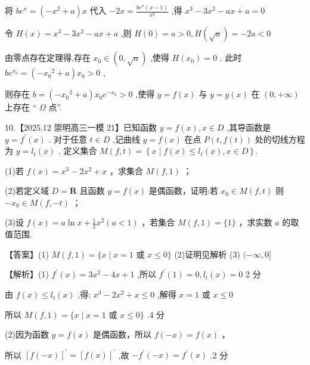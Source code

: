 \documentclass[10pt]{article}
\begin{document}
将 \(b{e}^{x} = \left( {-{x}^{2} + a}\right) x\) 代入 \(- {2x} = \frac{b{e}^{x}\left( {x - 1}\right) }{{x}^{2}}\) ,得 \({x}^{3} - 3{x}^{2} - {ax} + a = 0\)

令 \(H\left( x\right)  = {x}^{3} - 3{x}^{2} - {ax} + a\) ,则 \(H\left( 0\right)  = a > 0,H\left( \sqrt{a}\right)  =  - {2a} < 0\)

由零点存在定理得,存在 \({x}_{0} \in  \left( {0,\sqrt{a}}\right)\) ,使得 \(H\left( {x}_{0}\right)  = 0\) . 此时 \(b{e}^{{x}_{0}} = \left( {-{x}_{0}{}^{2} + a}\right) {x}_{0} > 0\) ,

则存在 \(b = \left( {-{x}_{0}{}^{2} + a}\right) {x}_{0}{e}^{-{x}_{0}} > 0\) ,使得 \(y = f\left( x\right)\) 与 \(y = g\left( x\right)\) 在 \(\left( {0, + \infty }\right)\) 上存在 “ \(\Omega\) 点”.

10.【2025.12 崇明高三一模 21】已知函数 \(y = f\left( x\right) ,x \in  D\) ,其导函数是 \(y = {f}^{\prime }\left( x\right)\) . 对于任意 \(t \in  D\) ,记曲线 \(y = f\left( x\right)\) 在点 \(P\left( {t,f\left( t\right) }\right)\) 处的切线方程为 \(y = {l}_{t}\left( x\right)\) . 定义集合 \(M\left( {f,t}\right)  = \left\{  {x \mid  f\left( x\right)  \leq  {l}_{t}\left( x\right) ,x \in  D}\right\}  .\)

(1)若 \(f\left( x\right)  = {x}^{3} - 2{x}^{2} + x\) ，求集合 \(M\left( {f,1}\right)\) ；

(2)若定义域 \(D = \mathbf{R}\) 且函数 \(y = f\left( x\right)\) 是偶函数，证明:若 \({x}_{0} \in  M\left( {f,t}\right)\) 则 \(- {x}_{0} \in  M\left( {f, - t}\right)\) ；

(3)设 \(f\left( x\right)  = a\ln x + \frac{1}{2}{x}^{2}\left( {a < 1}\right)\) ，若集合 \(M\left( {f,1}\right)  = \{ 1\}\) ，求实数 \(a\) 的取值范围.

【答案】(1) \(M\left( {f,1}\right)  = \{ x \mid  x = 1\) 或 \(x \leq  0\}\) (2)证明见解析 (3) \(( - \infty ,0\rbrack\)

【解析】(1) \({f}^{\prime }\left( x\right)  = 3{x}^{2} - {4x} + 1\) ,所以 \({f}^{\prime }\left( 1\right)  = 0,{l}_{t}\left( x\right)  = 0\) 2 分

由 \(f\left( x\right)  \leq  {l}_{t}\left( x\right)\) ,得: \({x}^{3} - 2{x}^{2} + x \leq  0\) ,解得 \(x = 1\) 或 \(x \leq  0\)

所以 \(M\left( {f,1}\right)  = \{ x \mid  x = 1\) 或 \(x \leq  0\}\) .4 分

(2)因为函数 \(y = f\left( x\right)\) 是偶函数，所以 \(f\left( {-x}\right)  = f\left( x\right)\) ，

所以 \({\left\lbrack  f\left( -x\right) \right\rbrack  }^{\prime } = {\left\lbrack  f\left( x\right) \right\rbrack  }^{\prime }\) ,故 \(- {f}^{\prime }\left( {-x}\right)  = {f}^{\prime }\left( x\right)\) .2 分
\end{document}
